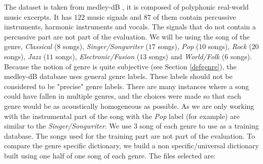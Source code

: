 \documentclass{article}
\begin{document}
The dataset is taken from medley-dB \cite{bittner2014medleydb}, it is composed of polyphonic real-world music excerpts. It has $122$ music signals and $87$ of them contain percussive instruments, harmonic instruments and vocals. The signals that do not contain a percussive part are not part of the evaluation. We will be using the song of the genre, \emph{Classical} ($8$ songs), \emph{Singer/Songwriter} ($17$ songs), \emph{Pop} ($10$ songs), \emph{Rock} ($20$ songs), \emph{Jazz} ($11$ songs), \emph{Electronic/Fusion} ($13$ songs) and \emph{World/Folk} ($6$ songs). Because the notion of genre is quite subjective (see Section \ref{defgenre}), the medley-dB database uses general genre labels. These labels should not be considered to be "precise" genre labels. There are many instances where a song could have fallen in multiple genres, and the choices were made so that each genre would be as acoustically homogeneous as possible. As we are only working with the instrumental part of the song with the \emph{Pop} label (for example) are similar to the \emph{Singer/Songwriter}.
We use $3$ song of each genre to use as a training database. The songs used for the training part are not part of the evaluation. To compare the genre specific dictionary, we build a non specific/universal dictionary built using one half of one song of each genre. The files selected are:
\end{document}
